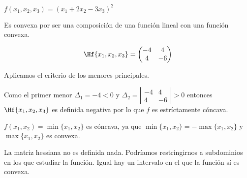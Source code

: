 \begin{problem}[3]

\ppart $f(x_1,x_2,x_3) = (x_1+2x_2 - 3x_3)^2$

\ppart

\solution

\spart Es convexa por ser una composición de una función lineal con una función convexa.


\ppart

\[
\Hf{x_1,x_2,x_3} = \begin{pmatrix}
-4&4\\4&-6
\end{pmatrix}
\]

Aplicamos el criterio de los menores principales.

Como el primer menor $\Delta_1 = -4 < 0$ y $\Delta_2 = \left|\begin{array}{cc}-4&4\\4&-6\end{array}\right| > 0$ entonces $\Hf{x_1,x_2,x_3}$ es definida negativa por lo que $f$ es estríctamente cóncava.


\ppart $f(x_1,x_2) = \min\{x_1,x_2\}$ es cóncava, ya que $\min\{x_1,x_2\} = -\max\{x_1,x_2\} $ y $\max\{x_1,x_2\}$ es convexa.

\ppart La matriz hessiana no es definida nada.
%
Podríamos restringirnos a subdominios en los que estudiar la función.
%
Igual hay un intervalo en el que la función sí es convexa.
\end{problem}


